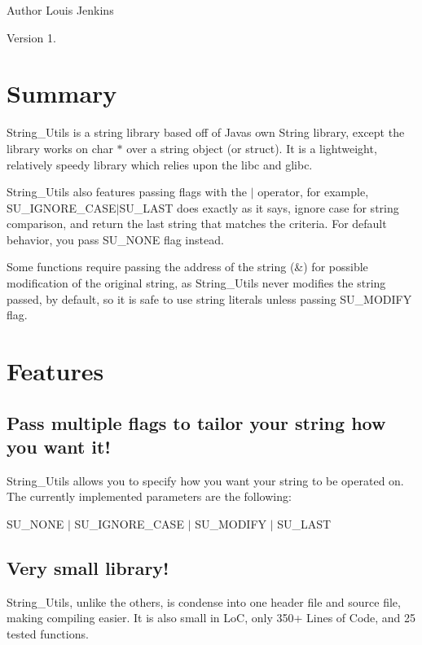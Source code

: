\begin{DoxyAuthor}{Author}
Louis Jenkins 
\end{DoxyAuthor}
\begin{DoxyVersion}{Version}
1.
\end{DoxyVersion}
\hypertarget{index_list_summary}{}\section{Summary}\label{index_list_summary}
String\+\_\+\+Utils is a string library based off of Java\textquotesingle{}s own String library, except the library works on char $\ast$ over a string object (or struct). It is a lightweight, relatively speedy library which relies upon the libc and glibc.

String\+\_\+\+Utils also features passing flags with the \textquotesingle{}$\vert$\textquotesingle{} operator, for example, S\+U\+\_\+\+I\+G\+N\+O\+R\+E\+\_\+\+C\+A\+S\+E$\vert$\+S\+U\+\_\+\+L\+A\+S\+T does exactly as it says, ignore case for string comparison, and return the last string that matches the criteria. For default behavior, you pass S\+U\+\_\+\+N\+O\+N\+E flag instead.

Some functions require passing the address of the string (\&) for possible modification of the original string, as String\+\_\+\+Utils never modifies the string passed, by default, so it is safe to use string literals unless passing S\+U\+\_\+\+M\+O\+D\+I\+F\+Y flag.\hypertarget{index_list_features}{}\section{Features}\label{index_list_features}
\hypertarget{index_tailor}{}\subsection{Pass multiple flags to tailor your string how you want it!}\label{index_tailor}
String\+\_\+\+Utils allows you to specify how you want your string to be operated on. The currently implemented parameters are the following\+:

S\+U\+\_\+\+N\+O\+N\+E $\vert$ S\+U\+\_\+\+I\+G\+N\+O\+R\+E\+\_\+\+C\+A\+S\+E $\vert$ S\+U\+\_\+\+M\+O\+D\+I\+F\+Y $\vert$ S\+U\+\_\+\+L\+A\+S\+T\hypertarget{index_small}{}\subsection{Very small library!}\label{index_small}
String\+\_\+\+Utils, unlike the others, is condense into one header file and source file, making compiling easier. It is also small in Lo\+C, only 350+ Lines of Code, and 25 tested functions. 